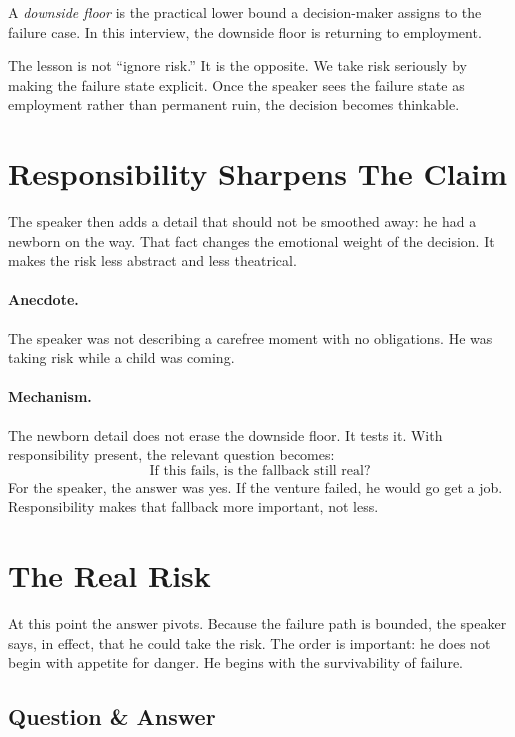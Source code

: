 \begin{definition}
A \emph{downside floor} is the practical lower bound a decision-maker assigns to the failure case. In this interview, the downside floor is returning to employment.
\end{definition}

The lesson is not ``ignore risk.'' It is the opposite. We take risk seriously by making the failure state explicit. Once the speaker sees the failure state as employment rather than permanent ruin, the decision becomes thinkable.

\section{Responsibility Sharpens The Claim}

The speaker then adds a detail that should not be smoothed away: he had a newborn on the way. That fact changes the emotional weight of the decision. It makes the risk less abstract and less theatrical.

\paragraph{Anecdote.}
The speaker was not describing a carefree moment with no obligations. He was taking risk while a child was coming.

\paragraph{Mechanism.}
The newborn detail does not erase the downside floor. It tests it. With responsibility present, the relevant question becomes:
\begin{equation}
\text{If this fails, is the fallback still real?}
\end{equation}
For the speaker, the answer was yes. If the venture failed, he would go get a job. Responsibility makes that fallback more important, not less.

\section{The Real Risk}

At this point the answer pivots. Because the failure path is bounded, the speaker says, in effect, that he could take the risk. The order is important: he does not begin with appetite for danger. He begins with the survivability of failure.

\subsection{Question \& Answer}

